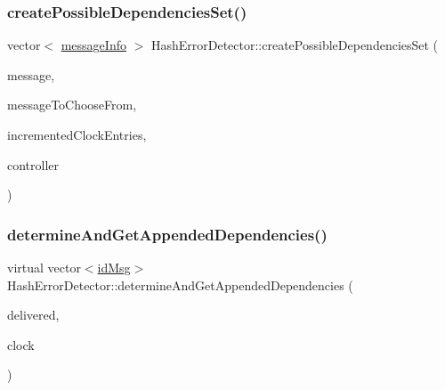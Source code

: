 \mbox{\label{classHashErrorDetector_ae8605d778886baa20648a9f5955c5943}} 
\subsubsection{\texorpdfstring{create\+Possible\+Dependencies\+Set()}{createPossibleDependenciesSet()}}
{\footnotesize\ttfamily vector$<$ \hyperlink{structures_8h_a7e7bdc1d2fff8a9436f2f352b2711ed6}{message\+Info} $>$ Hash\+Error\+Detector\+::create\+Possible\+Dependencies\+Set (\begin{DoxyParamCaption}\item[{const \hyperlink{structures_8h_a7e7bdc1d2fff8a9436f2f352b2711ed6}{message\+Info} \&}]{message,  }\item[{const vector$<$ \hyperlink{structures_8h_a7e7bdc1d2fff8a9436f2f352b2711ed6}{message\+Info} $>$ \&}]{message\+To\+Choose\+From,  }\item[{const vector$<$ unsigned int $>$ \&}]{incremented\+Clock\+Entries,  }\item[{\hyperlink{classController}{Controller} $\ast$}]{controller }\end{DoxyParamCaption})}

\mbox{\label{classHashErrorDetector_ae45353331e29b50a0aa2fc6dd540ed4e}} 
\subsubsection{\texorpdfstring{determine\+And\+Get\+Appended\+Dependencies()}{determineAndGetAppendedDependencies()}}
{\footnotesize\ttfamily virtual vector$<$\hyperlink{structures_8h_a83a1d9a070efa5341da84cfd8e28d3e5}{id\+Msg}$>$ Hash\+Error\+Detector\+::determine\+And\+Get\+Appended\+Dependencies (\begin{DoxyParamCaption}\item[{const vector$<$ \hyperlink{structures_8h_a7e7bdc1d2fff8a9436f2f352b2711ed6}{message\+Info} $>$ \&}]{delivered,  }\item[{const \hyperlink{classProbabilisticClock}{Probabilistic\+Clock} \&}]{clock }\end{DoxyParamCaption})\hspace{0.3cm}{\ttfamily [pure virtual]}}



